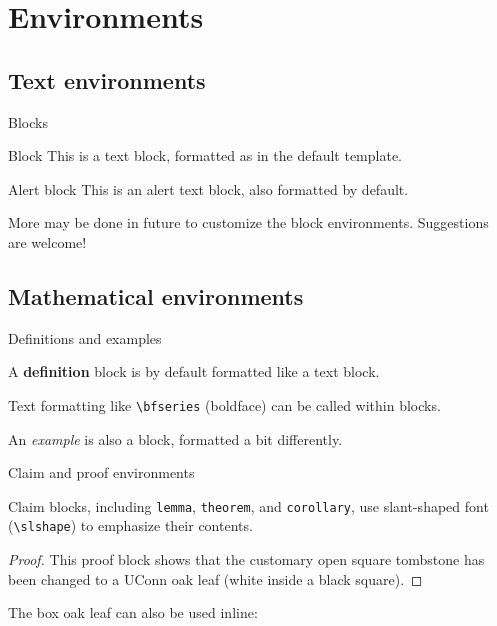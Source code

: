 \documentclass{beamer}
\begin{document}
\section{Environments}


\subsection{Text environments}


\begin{frame}{Blocks}

\begin{block}{Block}
This is a text block, formatted as in the default template.
\end{block}

\begin{alertblock}{Alert block}
This is an alert text block, also formatted by default.
\end{alertblock}

More may be done in future to customize the block environments. Suggestions are welcome!

\end{frame}


\subsection{Mathematical environments}


\begin{frame}[fragile]{Definitions and examples}

\begin{definition}
A {\bfseries definition} block is by default formatted like a text block.
\end{definition}

Text formatting like \verb|\bfseries| (boldface) can be called within blocks.

\begin{example}
An \emph{example} is also a block, formatted a bit differently.
\end{example}

\end{frame}


\begin{frame}[fragile]{Claim and proof environments}

\begin{theorem}
Claim blocks, including \verb|lemma|, \verb|theorem|, and \verb|corollary|, use slant-shaped font (\verb|\slshape|) to emphasize their contents.
\end{theorem}

\begin{proof}
This proof block shows that the customary open square tombstone has been changed to a UConn oak leaf (white inside a black square).
\end{proof}

\begin{corollary}
The box oak leaf can also be used inline: \oakleafbox
\end{corollary}

\end{frame}
\end{document}

